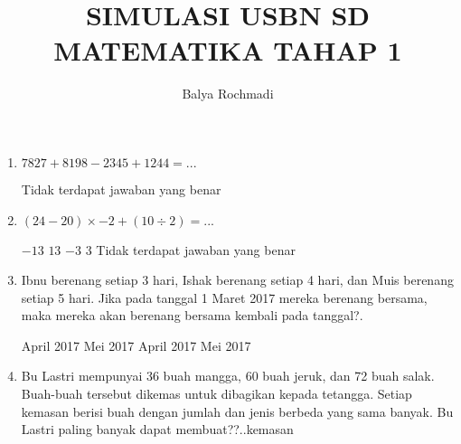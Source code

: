 \documentclass[14pt,a4paper]{exam}
\author{Balya Rochmadi}
\title{SIMULASI USBN SD MATEMATIKA TAHAP 1}
\begin{document}
\Large
\maketitle

\begin{enumerate}
	\item  $7827+8198-2345+1244=...$
	\begin{choices}
		\choice Tidak terdapat jawaban yang benar
	\end{choices}
	\item  $(24-20)\times -2 + (10 \div 2)=...$
	\begin{choices}
		\choice $-13$
		\choice $13$
		\choice $-3$		
		\choice $ 3$
		\choice Tidak terdapat jawaban yang benar
	\end{choices}
	\item Ibnu berenang setiap 3 hari, Ishak berenang setiap 4 hari, dan Muis berenang setiap 5 hari. Jika pada tanggal 1 Maret 2017 mereka berenang bersama, maka mereka akan berenang bersama kembali pada tanggal?.
	\begin{choices}
		 April 2017                              
		 Mei 2017
		 April 2017                              
		 Mei 2017
	\end{choices}
	\item Bu Lastri mempunyai 36 buah mangga, 60 buah jeruk, dan 72 buah salak. Buah-buah tersebut dikemas untuk dibagikan kepada tetangga. Setiap kemasan berisi buah dengan jumlah dan jenis berbeda yang sama banyak. Bu Lastri paling banyak dapat membuat??..kemasan
	
\end{enumerate}	
	
	
\end{document}
